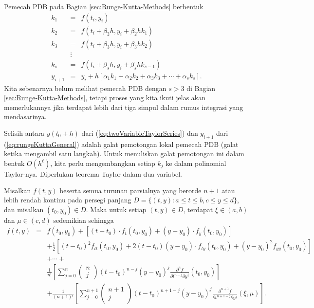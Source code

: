 Pemecah PDB pada Bagian \ref{sec:Runge-Kutta-Methods} berbentuk
\begin{eqnarray}
k_{1} & = & f(t_{i},y_{i})\nonumber \\
k_{2} & = & f\left(t_{i}+\beta_{2}h,y_{i}+\beta_{2}hk_{1}\right)\nonumber \\
k_{3} & = & f(t_{i}+\beta_{3}h,y_{i}+\beta_{3}hk_{2})\nonumber \\
 & \vdots\nonumber \\
k_{s} & = & f(t_{i}+\beta_{s}h,y_{i}+\beta_{s}hk_{s-1})\nonumber \\
y_{i+1} & = & y_{i}+h\left[\alpha_{1}k_{1}+\alpha_{2}k_{2}+\alpha_{3}k_{3}+\cdots+\alpha_{s}k_{s}\right].\label{eq:rungeKuttaGeneral}
\end{eqnarray}
Kita sebenarnya belum melihat pemecah PDB dengan $s>3$ di Bagian
\ref{sec:Runge-Kutta-Methods}, tetapi proses yang kita ikuti jelas
akan memerlukannya jika terdapat lebih dari tiga simpul dalam rumus
integrasi yang mendasarinya. 

Selisih antara $y(t_{0}+h)$ dari (\ref{eq:twoVariableTaylorSeries})
dan $y_{i+1}$ dari (\ref{eq:rungeKuttaGeneral}) adalah galat pemotongan
lokal pemecah PDB (galat ketika mengambil satu langkah). Untuk menuliskan
galat pemotongan ini dalam bentuk $O(h^{\ell})$, kita perlu mengembangkan
setiap $k_{j}$ ke dalam polinomial Taylor-nya. Diperlukan teorema
Taylor dalam dua variabel.
\begin{thm}
\label{thm:twoVariableTaylors}Misalkan
$f(t,y)$ beserta semua turunan parsialnya yang berorde $n+1$ atau
lebih rendah kontinu pada persegi panjang $D=\{(t,y):a\leq t\leq b,c\leq y\leq d\}$,
dan misalkan $(t_{0},y_{0})\in D$. Maka untuk setiap $(t,y)\in D$,
terdapat $\xi\in(a,b)$ dan $\mu\in(c,d)$ sedemikian sehingga 
\begin{eqnarray*}
f(t,y) & = & f(t_{0},y_{0})+\left[(t-t_{0})\cdot f_{t}(t_{0},y_{0})+(y-y_{0})\cdot f_{y}(t_{0},y_{0})\right]\\
 &  & +\frac{1}{2}\left[(t-t_{0})^{2}f_{tt}(t_{0},y_{0})+2(t-t_{0})(y-y_{0})\cdot f_{ty}(t_{0},y_{0})+(y-y_{0})^{2}f_{yy}(t_{0},y_{0})\right]\\
 &  & +\cdots+\\
 &  & \frac{1}{n!}\left[\sum_{j=0}^{n}\left(\begin{array}{c}
n\\
j
\end{array}\right)(t-t_{0})^{n-j}(y-y_{0})^{j}\frac{\partial^{n}f}{\partial t^{n-j}\partial y^{j}}(t_{0},y_{0})\right]\\
 &  & +\frac{1}{(n+1)!}\left[\sum_{j=0}^{n+1}\left(\begin{array}{c}
n+1\\
j
\end{array}\right)(t-t_{0})^{n+1-j}(y-y_{0})^{j}\frac{\partial^{n+1}f}{\partial t^{n+1-j}\partial y^{j}}(\xi,\mu)\right].
\end{eqnarray*}
\end{thm}

